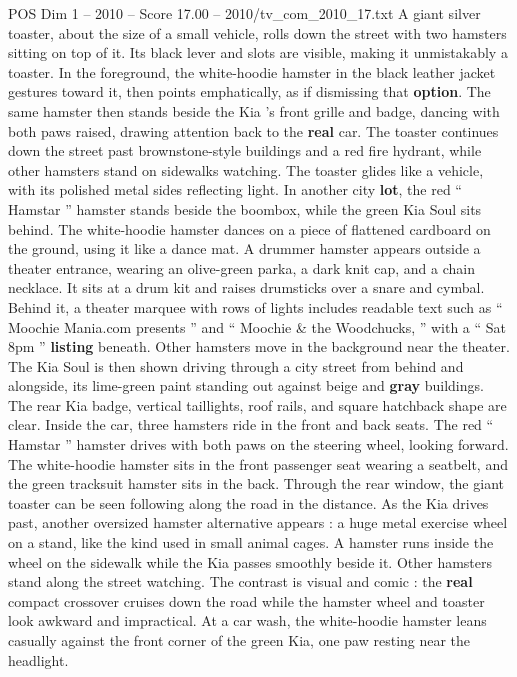 \begin{textsample}{POS Dim 1 – 2010 – Score 17.00 – 2010/tv\_com\_2010\_17.txt}
A giant silver toaster, about the size of a small vehicle, rolls down the street with two hamsters sitting on top of it.
Its black lever and slots are visible, making it unmistakably a toaster.
In the foreground, the white-hoodie hamster in the black leather jacket gestures toward it, then points emphatically, as if dismissing that \textbf{option}.
The same hamster then stands beside the Kia ’s front grille and badge, dancing with both paws raised, drawing attention back to the \textbf{real} car.
The toaster continues down the street past brownstone-style buildings and a red fire hydrant, while other hamsters stand on sidewalks watching.
The toaster glides like a vehicle, with its polished metal sides reflecting light.
In another city \textbf{lot}, the red “ Hamstar ” hamster stands beside the boombox, while the green Kia Soul sits behind.
The white-hoodie hamster dances on a piece of flattened cardboard on the ground, using it like a dance mat.
A drummer hamster appears outside a theater entrance, wearing an olive-green parka, a dark knit cap, and a chain necklace.
It sits at a drum kit and raises drumsticks over a snare and cymbal.
Behind it, a theater marquee with rows of lights includes readable text such as “ Moochie Mania.com presents ” and “ Moochie \& the Woodchucks, ” with a “ Sat 8pm ” \textbf{listing} beneath.
Other hamsters move in the background near the theater.
The Kia Soul is then shown driving through a city street from behind and alongside, its lime-green paint standing out against beige and \textbf{gray} buildings.
The rear Kia badge, vertical taillights, roof rails, and square hatchback shape are clear.
Inside the car, three hamsters ride in the front and back seats.
The red “ Hamstar ” hamster drives with both paws on the steering wheel, looking forward.
The white-hoodie hamster sits in the front passenger seat wearing a seatbelt, and the green tracksuit hamster sits in the back.
Through the rear window, the giant toaster can be seen following along the road in the distance.
As the Kia drives past, another oversized hamster alternative appears : a huge metal exercise wheel on a stand, like the kind used in small animal cages.
A hamster runs inside the wheel on the sidewalk while the Kia passes smoothly beside it.
Other hamsters stand along the street watching.
The contrast is visual and comic : the \textbf{real} compact crossover cruises down the road while the hamster wheel and toaster look awkward and impractical.
At a car wash, the white-hoodie hamster leans casually against the front corner of the green Kia, one paw resting near the headlight.

\end{textsample}
